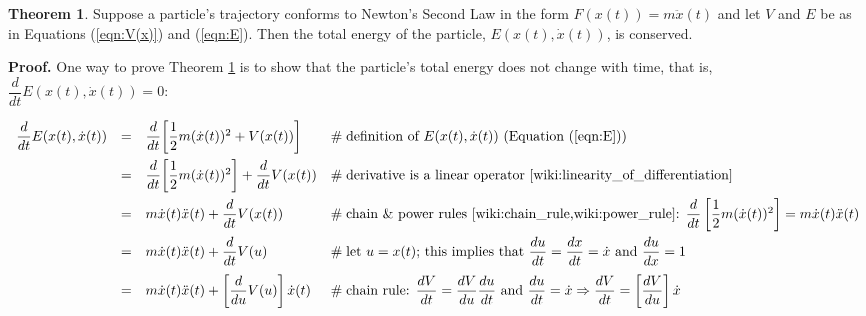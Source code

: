 \documentclass{article}
\theoremstyle{definition}
\newtheorem{theorem}{Theorem}[section]
\begin{document}
\medskip
\begin{theorem}
\label{theorem:conservation_of_energy_in_R1}
Suppose a particle's trajectory conforms to Newton’s Second Law 
in the form $F(x(t)) = m\ddot{x}(t)$ and let $V$ and $E$ be as 
in Equations (\ref{eqn:V(x)}) and (\ref{eqn:E}). Then the total 
energy of the particle, $E(x(t),\dot{x}(t))$, is conserved.

\medskip
{
\noindent
{\bf Proof.} One way to prove Theorem \ref{theorem:conservation_of_energy_in_R1}
is to show that the particle's total energy does not change with time, 
that is,$\dfrac{d}{dt}E(x(t),\dot{x}(t)) = 0$:
\par}
%
%
%
\begin{equation*}
\begin{array}{llll}
\dfrac{d}{dt} E(x(t),\dot{x}(t))
&=& \dfrac{d}{dt} \bigg [\dfrac{1}{2}m(\dot{x}(t))^{2} + V(x(t)) \bigg ]
		&\hspace{0em} \mathrel{\#} \text{definition of $E(x(t),\dot{x}(t))$ 
		                                 (Equation (\ref{eqn:E}))} \\		
[10pt]
&=& \dfrac{d}{dt} \bigg [ \dfrac{1}{2}m(\dot{x}(t))^{2} \bigg ] + \dfrac{d}{dt} V(x(t))
		&\hspace{0em} \mathrel{\#} \text{derivative is a linear 
		                                 operator \cite{wiki:linearity_of_differentiation}} \\
[10pt]
&=& m\dot{x}(t)\ddot{x}(t) + \dfrac{d}{dt} V(x(t))
		&\hspace{0em} \mathrel{\#} \text{chain \& power rules \cite{wiki:chain_rule,wiki:power_rule}:
										 $\dfrac{d}{dt} \left [  \dfrac{1}{2}m(\dot{x}(t))^{2} \right ] = 
										 m\dot{x}(t)\ddot{x}(t)$} \\
[10pt]
&=& m\dot{x}(t)\ddot{x}(t) + \dfrac{d}{dt} V(u)
		&\hspace{0em} \mathrel{\#} \text{let $u = x(t)$; this implies that
		                                 $\dfrac{du}{dt} = \dfrac{dx}{dt} = \dot{x}$
		                                 and 
		                                 $\dfrac{du}{dx} = 1$} \\
[10pt]
&=& m\dot{x}(t)\ddot{x}(t) + \left [\dfrac{d}{du}  V(u) \right ] \dot{x}(t)
		&\hspace{0em} \mathrel{\#} \text{chain rule: 
								         $\dfrac{dV}{dt} = 
					                     \dfrac{dV}{du} \dfrac{du}{dt}$
					                     and
							             $\dfrac{du}{dt} = \dot{x} 
							             \Rightarrow 
							             \dfrac{dV}{dt} = \left [\dfrac{dV}{du} \right ]\dot{x}$} \\

\end{array}
\end{equation*}
\end{theorem}
\end{document}
